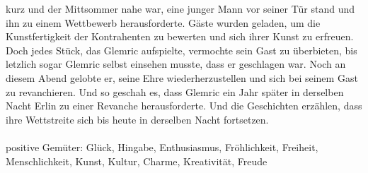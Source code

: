 kurz und der Mittsommer nahe war, eine junger Mann vor seiner Tür stand und ihn zu einem Wettbewerb herausforderte. Gäste wurden geladen, um die Kunstfertigkeit der Kontrahenten 
zu bewerten und sich ihrer Kunst zu erfreuen. Doch jedes Stück, das Glemric aufspielte, vermochte sein Gast zu überbieten, bis letzlich sogar Glemric selbst einsehen musste, 
dass er geschlagen war. Noch an diesem Abend gelobte er, seine Ehre wiederherzustellen und sich bei seinem Gast zu revanchieren. Und so geschah es, dass Glemric ein Jahr später 
in derselben Nacht Erlin zu einer Revanche herausforderte. Und die Geschichten erzählen, dass ihre Wettstreite sich bis heute in derselben Nacht fortsetzen.\\~\\
positive Gemüter: Glück, Hingabe, Enthusiasmus, Fröhlichkeit, Freiheit, Menschlichkeit, Kunst, Kultur, Charme, Kreativität, Freude

